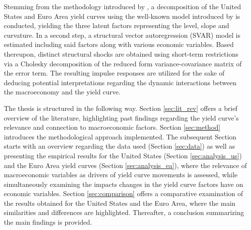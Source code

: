 Stemming from the methodology introduced by \citet{diebold2006macroeconomy}, a decomposition of the United States and Euro Area yield curves using the well-known model introduced by \citet{nelson1987parsimonious} is conducted, yielding the three latent factors representing the level, slope and curvature.
In a second step, a structural vector autoregression (SVAR) model is estimated including said factors along with various economic variables.
Based thereupon, distinct structural shocks are obtained using short-term restrictions via a Cholesky decomposition of the reduced form variance-covariance matrix of the error term.
The resulting impulse responses are utilized for the sake of deducing potential interpretations regarding the dynamic interactions between the macroeconomy and the yield curve.

The thesis is structured in the following way. 
Section \ref{sec:lit_rev} offers a brief overview of the literature, highlighting past findings regarding the yield curve's relevance and connection to macroeconomic factors. 
Section \ref{sec:method} introduces the methodological approach implemented.
The subsequent Section starts with an overview regarding the data used (Section \ref{sec:data}) as well as presenting the empirical results for the United States (Section \ref{sec:analysis_us}) and the Euro Area yield curves (Section \ref{sec:analysis_ea}), where the relevance of macroeconomic variables as drivers of yield curve movements is assessed, while simultaneously examining the impacts changes in the yield curve factors have on economic variables.
Section \ref{sec:comparison} offers a comparative examination of the results obtained for the United States and the Euro Area, where the main similarities and differences are highlighted. 
Thereafter, a conclusion summarizing the main findings is provided. 












